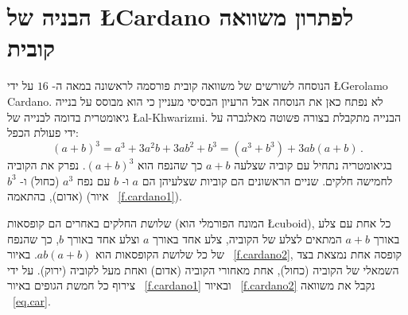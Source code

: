 
\section{הבניה של
\L{Cardano}
לפתרון משוואה קובית}
\label{s.cardano}

הנוסחה לשורשים של משוואה קובית פורסמה לראשונה במאה ה-%
$16$
על ידי 
\L{Gerolamo Cardano}.
לא נפתח כאן את הנוסחה אבל הרעיון הבסיסי מעניין כי הוא מבוסס על בנייה גיאומטרית בדומה לבנייה של 
\L{al-Khwarizmi}.
הבנייה מתקבלת בצורה פשוטה מאלגברה על ידי פעולת הכפל:
\begin{equation}\label{eq.car}
(a+b)^3=a^3+3a^2b+3ab^2+b^3=(a^3+b^3)+3ab(a+b)\,.
\end{equation}
בגיאומטריה נתחיל עם קוביה שצלעה 
$a+b$
כך שהנפח הוא
$(a+b)^3$.
נפרק את הקוביה לחמישה חלקים. שניים הראשונים הם קוביות שצלעיהן הם
$a$
ו-%
$b$
עם נפח
$a^3$ (כחול)
ו-%
$b^3$ (אדום),
בהתאמה (איור%
~\ref{f.cardano1}).

שלושת החלקים באחרים הם קופסאות (המונח הפורמלי הוא
\L{cuboid}),
כל אחת עם צלע באורך
$a+b$
המתאים לצלע של הקוביה, צלע אחד באורך
$a$
וצלע אחד באורך
$b$,
כך שהנפח של כל שלושת הקופסאות הוא
$ab(a+b)$.
באיור%
~\ref{f.cardano2},
קופסה אחת נמצאת בצד השמאלי של הקוביה (כחול), אחת מאחורי הקוביה (אדום) ואחת מעל לקוביה (ירוק). על ידי צירוף כל חמשת הגופים באיור%
~\ref{f.cardano1}
ובאיור%
~\ref{f.cardano2}
נקבל את משוואה
~\ref{eq.car}.


